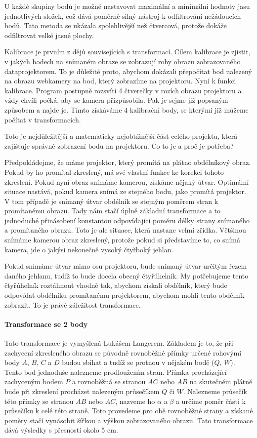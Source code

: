 \documentclass[twoside,12pt]{article}
\newcommand{\podpodsekce}[1]{\paragraph{#1}\quad\vskip 6pt}
\begin{document}
U každé skupiny bodů je možné nastavovat maximální a minimální hodnoty jasu jednotlivých složek, což dává poměrně silný nástroj k odfiltrování nežádoucích bodů. Tato metoda se ukázala spolehlivější než čtvercová, protože dokáže odfiltrovat velké jasné plochy.

Kalibrace je prvním z dějů souvisejících s transformací. Cílem kalibrace je zjistit, v jakých bodech na snímaném obraze se zobrazují rohy obrazu zobrazovaného dataprojektorem. To je důležité proto, abychom dokázali přepočítat bod nalezený na obrazu webkamery na bod, který zobrazíme na projektoru. Nyní k funkci kalibrace. Program postupně rozsvítí 4 čtverečky v rozích obrazu projektoru a vždy chvíli počká, aby se kamera přizpůsobila. Pak je sejme již popsaným způsobem a najde je. Tímto získáváme 4 kalibrační body, se kterými již můžeme počítat v transformacích.

Toto je nejdůležitější a matematicky nejobtížnější část celého projektu, která zajišťuje správné zobrazení bodu na projektoru. Co to je a proč je potřeba?

Předpokládejme, že máme projektor, který promítá na plátno obdélníkový obraz. Pokud by ho promítal zkreslený, má své vlastní funkce ke korekci tohoto zkreslení. Pokud nyní obraz snímáme kamerou, získáme nějaký útvar. Optimální situace nastává, pokud kamera snímá ze stejného bodu, jako promítá projektor. V tom případě je snímaný útvar obdélník se stejným poměrem stran k promítanému obrazu. Tady nám stačí úplně základní transformace a to jednoduché přinásobení konstantou odpovídající poměru délky strany snímaného a promítaného obrazu. Toto je ale situace, která nastane velmi zřídka. Většinou snímáme kamerou obraz zkreslený, protože pokud si představíme to, co snímá kamera, jde o jakýsi nekonečně vysoký čtyřboký jehlan.

Pokud snímáme útvar mimo osu projektoru, bude snímaný útvar určitým řezem daného jehlanu, tudíž to bude docela obecný čtyřúhelník. My potřebujeme tento čtyřúhelník roztáhnout vhodně tak, abychom získali obdélník, který bude odpovídat obdélníku promítanému projektorem, abychom mohli tento obdélník zobrazit. To je právě záležitost transformace.

\podpodsekce{Transformace se 2 body}

Tato transformace je vymyšlená Lukášem Langerem. Základem je to, že při zachycení zkresleného obrazu se původně rovnoběžné přímky určené rohovými body $A$, $B$, $C$ a $D$ budou sbíhat a tudíž se protnou v nějakém bodě ($Q$, $W$). Tento bod jednoduše nalezneme prodloužením stran. Přímka procházející zachyceným bodem $P$ a rovnoběžná se stranou  $AC$ nebo $AB$ na skutečném plátně bude při zkreslení procházet nalezeným průsečíkem $Q$ či $W$. Nalezneme průsečík této přímky se stranou $AB$ nebo $AC$, nazveme ho $\alpha$ a $\beta$ a určíme poměr části k průsečíku k celé této straně. Toto provedeme pro obě rovnoběžné strany a získané poměry stačí vynásobit šířkou a výškou zobrazovaného obrazu. Tato transformace dává výsledky s přesností okolo 5 cm.
\end{document}
